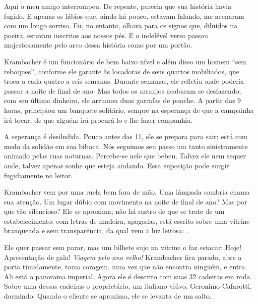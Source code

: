 Aqui o meu amigo interrompeu. De repente, parecia que sua história havia
fugido. E apenas os lábios que, ainda há pouco, estavam falando, me
acenaram com um longo sorriso. Eu, no entanto, olhava para os signos
que, diluídos na poeira, estavam inscritos aos nossos pés. E o indelével
verso passou majestosamente pelo arco dessa história como por um portão.


Krambacher é um funcionário de bem baixo nível e além disso um homem
``sem reboques'', conforme ele garante às locadoras de seus quartos
mobiliados, que troca a cada quatro a seis semanas. Durante semanas,
ele refletiu onde poderia passar a noite de final de ano. Mas todos os
arranjos acabaram se desfazendo; com seu último dinheiro, ele arrumou
duas garrafas de ponche. A partir das 9 horas, principiou um banquete
solitário, sempre na esperança de que a campainha irá tocar, de que
alguém irá procurá-lo e lhe fazer companhia.

A esperança é desiludida. Pouco antes das 11, ele se prepara para sair:
está com medo da solidão em sua biboca. Nós seguimos seu passo um tanto
sinistramente animado pelas ruas noturnas. Percebe-se nele que bebeu.
Talvez ele nem sequer ande, talvez apenas sonhe que esteja andando. Essa
suposição pode surgir fugidiamente no leitor.

Krambacher vem por uma ruela bem fora de mão. Uma lâmpada sombria chama
sua atenção. Um lugar dúbio com movimento na noite de final de ano? Mas
por que tão silencioso? Ele se aproxima, não há rastro de que se trate
de um estabelecimento: com letras de madeira, apagadas, está escrito
sobre uma vitrine branqueada e sem transparência, da qual vem a luz
leitosa: .

Ele quer passar sem parar, mas um bilhete sujo na vitrine o faz estacar:
Hoje! Apresentação de gala! \emph{Viagem pelo ano velho!} Krambacher
fica parado, abre a porta timidamente, toma coragem, uma vez que não
encontra ninguém, e entra. Ali está o panorama imperial. Agora ele é
descrito com suas 32 cadeiras em roda. Sobre uma dessas cadeiras o
proprietário, um italiano viúvo, Geronimo Cafarotti, dormindo. Quando o
cliente se aproxima, ele se levanta de um salto.

